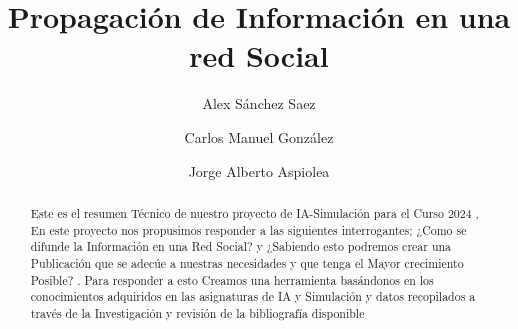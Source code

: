 \documentclass[acmtog]{acmart}
\begin{document}
\title{Propagación de Información en una red Social}

\author{Alex Sánchez Saez}
\author{Carlos Manuel González}
\author{Jorge Alberto Aspiolea}



\renewcommand{\shortauthors}{Alex,Carlos,Jorge}

\begin{abstract}
 Este es el resumen Técnico de nuestro proyecto de IA-Simulación para el Curso 2024 , En este proyecto nos propusimos responder a las siguientes interrogantes; ¿Como se difunde la Información en una Red Social? y ¿Sabiendo esto podremos crear una Publicación que se adecúe a nuestras necesidades y que tenga el Mayor crecimiento Posible? . Para responder a esto Creamos una herramienta basándonos en los conocimientos adquiridos en las asignaturas de IA y Simulación y datos recopilados a través de la Investigación y revisión de la bibliografía disponible
\end{abstract}



\maketitle
\end{document}
